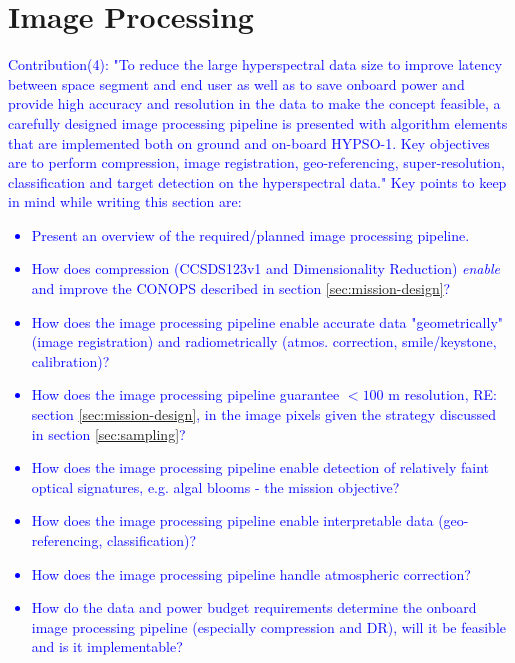 \section{Image Processing}
\textcolor{blue}{Contribution(4): "To reduce the large hyperspectral data size to improve latency between space segment and end user as well as to save onboard power and provide high accuracy and resolution in the data to make the concept feasible, a carefully designed image processing pipeline is presented with algorithm elements that are implemented both on ground and on-board HYPSO-1. Key objectives are to perform compression, image registration, geo-referencing, super-resolution, classification and target detection on the hyperspectral data." Key points to keep in mind while writing this section are:
\begin{itemize}
\item Present an overview of the required/planned image processing pipeline.
    \item How does compression (CCSDS123v1 and Dimensionality Reduction) \emph{enable} and improve the CONOPS described in section \ref{sec:mission-design}?
    \item How does the image processing pipeline enable accurate data "geometrically" (image registration) and radiometrically (atmos. correction, smile/keystone, calibration)?
    \item How does the image processing pipeline guarantee $<100$ m resolution, RE: section \ref{sec:mission-design}, in the image pixels given the strategy discussed in section \ref{sec:sampling}?
    \item How does the image processing pipeline enable detection of relatively faint optical signatures, e.g. algal blooms - the mission objective?
    \item How does the image processing pipeline enable interpretable data (geo-referencing, classification)?
    \item How does the image processing pipeline handle atmospheric correction?
    \item How do the data and power budget requirements determine the onboard image processing pipeline (especially compression and DR), will it be feasible and is it implementable?
\end{itemize}}

